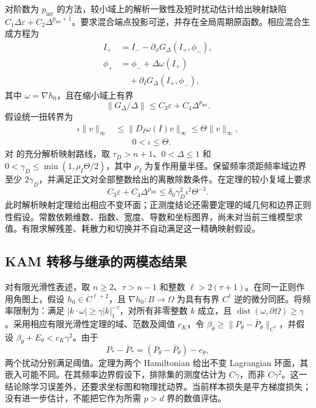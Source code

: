对阶数为 $p_{\mathrm{int}}$ 的方法，较小域上的解析一致性及短时扰动估计给出映射缺陷 $C_1\Delta\varepsilon+C_2\Delta^{p_{\mathrm{int}}+1}$。要求混合端点投影可逆，并存在全局周期原函数。相应混合生成方程为
\begin{equation}
 \begin{aligned}
 I_+&=I_--\partial_\phi G_\Delta(I_+,\phi_-),\\
 \phi_+&=\phi_-+\Delta\omega(I_+)\\
 &\quad+\partial_I G_\Delta(I_+,\phi_-),
 \end{aligned}
 \label{eq:supp-learn-discrete-generator}
\end{equation}
其中 $\omega=\nabla h_0$，且在缩小域上有界
\begin{equation}
 \|G_\Delta/\Delta\|\le C_3\varepsilon+C_4\Delta^{p_{\mathrm{int}}}.
 \label{eq:supp-learn-discrete-budget}
\end{equation}
假设统一扭转界为
\begin{equation}
 \begin{aligned}
 \iota\|v\|_\infty&\le\|D_I\omega(I)v\|_\infty\le\Theta\|v\|_\infty,\\
 &\qquad 0<\iota\le\Theta.
 \end{aligned}
 \label{eq:supp-learn-discrete-twist}
\end{equation}
对 \citet{Shang1999} 的充分解析映射路线，取 $\tau_D>n+1$、$0<\Delta\le1$ 和 $0<\gamma_D\le\min(1,\rho_I\Theta/2)$，其中 $\rho_I$ 为复作用量半径。保留频率须距频率域边界至少 $2\gamma_D$，并满足正文对全部整数给出的离散除数条件。在定理的较小复域上要求
\begin{equation}
 C_3\varepsilon+C_4\Delta^{p_{\mathrm{int}}}
 \le\delta_0\gamma_D^2\iota^2\Theta^{-3}.
 \label{eq:supp-learn-discrete-threshold}
\end{equation}
此时解析映射定理给出相应不变环面；正测度结论还需要定理的域几何和边界正则性假设。常数依赖维数、指数、宽度、导数和坐标图界，尚未对当前三维模型求值。有限求解残差、耗散力和切换并不自动满足这一精确映射假设。

\subsection{KAM 转移与继承的两模态结果}
对有限光滑性表述，取 $n\ge2$、$\tau>n-1$ 和整数 $\ell>2(\tau+1)$。在同一正则作用角图上，假设 $h_0\in C^{\ell+2}$，且 $\nabla h_0:B\to\Omega$ 为具有有界 $C^\ell$ 逆的微分同胚。将频率限制为：满足 $|k\cdot\omega|\ge\gamma|k|_1^{-\tau}$，对所有非零整数 $k$ 成立，且 $\operatorname{dist}(\omega,\partial\Omega)\ge\gamma$。采用相应有限光滑性定理\citep{Bounemoura2020}的域、范数及阈值 $c_K$，令 $\beta_\theta\ge\|P_\theta-\bar P_\theta\|_{C^\ell}$，并假设 $\beta_\theta+E_\theta<c_K\gamma^2$。由于
\begin{equation}
 P_*-\bar P_*=(P_\theta-\bar P_\theta)-e_\theta,
 \label{eq:supp-learn-kam-triangle}
\end{equation}
两个扰动分别满足阈值。定理为两个 Hamiltonian 给出不变 Lagrangian 环面，其嵌入可能不同。在其频率边界假设下，排除集的测度估计为 $C\gamma$，而非 $C\gamma^2$。这一结论除学习误差外，还要求坐标图和物理扰动界。当前样本损失是平方梯度损失；没有进一步估计，不能把它作为所需 $p>d$ 界的数值评估。

